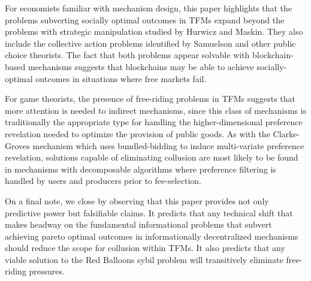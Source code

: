 \documentclass[oneside]{article}   	%
\begin{document}
For economists familiar with mechanism design, this paper highlights that the problems subverting socially optimal outcomes in TFMs expand beyond the problems with strategic manipulation studied by Hurwicz and Maskin. They also include the collective action problems identified by Samuelson and other public choice theorists. The fact that both problems appear solvable with blockchain-based mechanisms suggests that blockchains may be able to achieve socially-optimal outcomes in situations where free markets fail.

For game theorists, the presence of free-riding problems in TFMs suggests that more attention is needed to indirect mechanisms, since this class of mechanisms is traditionally the appropriate type for handling the higher-dimensional preference revelation needed to optimize the provision of public goods. As with the Clarke-Groves mechanism which uses bundled-bidding to induce multi-variate preference revelation, solutions capable of eliminating collusion are most likely to be found in mechanisms with decomposable algorithms where preference filtering is handled by users and producers prior to fee-selection.

On a final note, we close by observing that this paper provides not only predictive power but falsifiable claims. It predicts that any technical shift that makes headway on the fundamental informational problems that subvert achieving pareto optimal outcomes in informationally decentralized mechanisms should reduce the scope for collusion within TFMs. It also predicts that any viable solution to the Red Balloons sybil problem will transitively eliminate free-riding pressures.

\cleardoublepage

\end{document}
